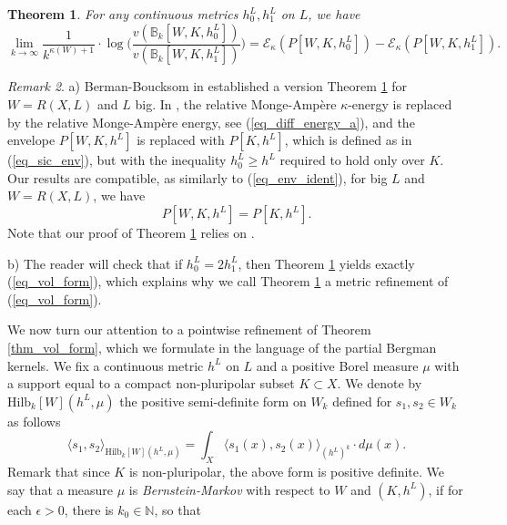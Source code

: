 \documentclass[12pt]{article}
\numberwithin{equation}{section}
\theoremstyle{theorem}
\newtheorem{thm}{Theorem}[section]
\theoremstyle{definition}
\theoremstyle{remark}
\newtheorem{rem}[thm]{Remark}
\newcommand{\vol}{v}
\newcommand{\nat}{\mathbb{N}}
\begin{document}
	\begin{thm}\label{thm_volumes_ratio}
		For any continuous metrics $h^L_0, h^L_1$ on $L$, we have
		\begin{equation}\label{rem_thm_isom2}
			\lim_{k \to \infty}
			\frac{1}{k^{\kappa(W) + 1}} \cdot \log \Big( \frac{\vol(\mathbb{B}_k[W, K, h^L_0])}{\vol(\mathbb{B}_k[W, K, h^L_1])} \Big)
			=
			\mathscr{E}_{\kappa}(P[W, K, h^L_0]) - \mathscr{E}_{\kappa}(P[W, K, h^L_1]).
		\end{equation}
	\end{thm}
	\begin{rem}
		a) Berman-Boucksom in \cite{BermanBouckBalls} established a version Theorem \ref{thm_volumes_ratio} for $W = R(X, L)$ and $L$ big.
		In \cite{BermanBouckBalls}, the relative Monge-Ampère $\kappa$-energy is replaced by the relative Monge-Ampère energy, see (\ref{eq_diff_energy_a}), and the envelope $P[W, K, h^L]$ is replaced with $P[K, h^L]$, which is defined as in (\ref{eq_sic_env}), but with the inequality $h^L_0 \geq h^L$ required to hold only over $K$. 
		Our results are compatible, as similarly to (\ref{eq_env_ident}), for big $L$ and $W = R(X, L)$, we have 
		\begin{equation}\label{eq_env_ident2}
    		P[W, K, h^L] = P[K, h^L].
		\end{equation}
		Note that our proof of Theorem \ref{thm_volumes_ratio} relies on \cite{BermanBouckBalls}.
		\par 
		b) The reader will check that if $h^L_0 = 2 h^L_1$, then Theorem \ref{thm_volumes_ratio} yields exactly (\ref{eq_vol_form}), which explains why we call Theorem \ref{thm_volumes_ratio} a metric refinement of (\ref{eq_vol_form}).
	\end{rem}
	\par
	We now turn our attention to a pointwise refinement of Theorem \ref{thm_vol_form}, which we formulate in the language of the partial Bergman kernels.
	We fix a continuous metric $h^L$ on $L$ and a positive Borel measure $\mu$ with a support equal to a compact non-pluripolar subset $K \subset X$.
	We denote by ${\textrm{Hilb}}_k[W](h^L, \mu)$ the positive semi-definite form on $W_k$ defined for $s_1, s_2 \in W_k$ as follows
	\begin{equation}\label{eq_defn_l2}
			\langle s_1, s_2 \rangle_{{\textrm{Hilb}}_k[W](h^L, \mu)} = \int_X \langle s_1(x), s_2(x) \rangle_{(h^L)^{k}} \cdot d \mu(x).
	\end{equation}
	Remark that since $K$ is non-pluripolar, the above form is positive definite.
	We say that a measure $\mu$ is \textit{Bernstein-Markov} with respect to $W$ and $(K, h^L)$, if for each $\epsilon > 0$, there is $k_0 \in \nat$, so that
\end{document}
